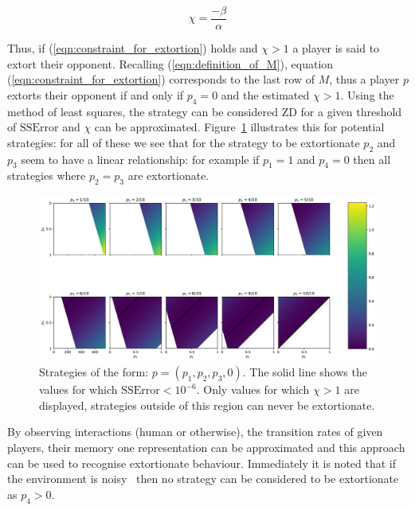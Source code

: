 \documentclass[a4paper]{article}
\begin{document}
\begin{equation}\label{eqn:definition_of_chi}
    \chi=\frac{-\beta}{\alpha}
\end{equation}

Thus, if (\ref{eqn:constraint_for_extortion}) holds and \(\chi >1\) a player is
said to extort their opponent. Recalling (\ref{eqn:definition_of_M}), equation
(\ref{eqn:constraint_for_extortion}) corresponds to the last row of \(M\), thus
a player \(p\) extorts their opponent if and only if \(p_4=0\) and the estimated
\(\chi > 1\). Using the method of least squares, the strategy can be
considered ZD for a given threshold of \(\text{SSError}\) and \(\chi\) can be
approximated. Figure~\ref{fig:examples_of_extortion} illustrates this for
potential strategies: for all of these we see that for the strategy to be
extortionate \(p_2\) and \(p_3\) seem to have a linear relationship: for example
if \(p_1=1\) and \(p_4=0\) then all strategies where \(p_2=p_3\) are
extortionate.

\begin{figure}[!htbp]
    \begin{center}
        \includegraphics[width=\textwidth]{assets/img/examples_of_extortion/main.pdf}
        \caption{Strategies of the form:
                 \(p=(p_1, p_2, p_3, 0)\). The solid line shows the values for
                 which \(\text{SSError} < 10 ^ {-6}\). Only values for which \(\chi > 1\) are
                 displayed, strategies outside of this region can never be
                 extortionate.}
        \label{fig:examples_of_extortion}
    \end{center}
\end{figure}

By observing interactions (human or otherwise), the transition rates of given
players, their memory one representation can be approximated and this approach
can be used to recognise extortionate behaviour. Immediately it is noted that if
the environment is noisy~\cite{Wu1995} then no strategy can be considered to be
extortionate as \(p_4>0\).
\end{document}
